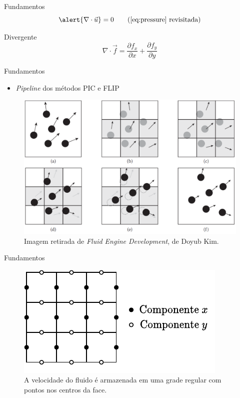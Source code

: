 \documentclass[aspectratio=169,xcolor=dvipsnames]{beamer}
\begin{document}
\begin{frame}{Fundamentos}
    \begin{equation}
        \alert{\nabla \cdot \Vec{u}} = 0
        \tag{\ref{eq:pressure} revisitada}
    \end{equation}
    
    \begin{block}{Divergente}
        \begin{equation}
            \nabla \cdot \Vec{f} =  \frac{\partial f_x}{\partial x} + \frac{\partial f_y}{\partial y}
        \end{equation}
    \end{block}

\end{frame}

\begin{frame}{Fundamentos}
\begin{itemize}
    \item \textit{Pipeline} dos métodos PIC e FLIP
\end{itemize}
    \begin{figure}
        \centering
        \includegraphics[width=0.55\linewidth]{figures/Pipeline.PNG}
        \caption{Imagem retirada de \textit{Fluid Engine Development}, de Doyub Kim.}
        \label{fig:pipeline}
    \end{figure}
\end{frame}

\begin{frame}{Fundamentos}
    \begin{figure}
        \centering
        \includegraphics{figures/FaceCenteredGrid.pdf}
        \caption{A velocidade do fluido é armazenada em uma grade regular com pontos nos centros da face.}
        \label{fig:facecenteredgrid}
    \end{figure}
\end{frame}
\end{document}
